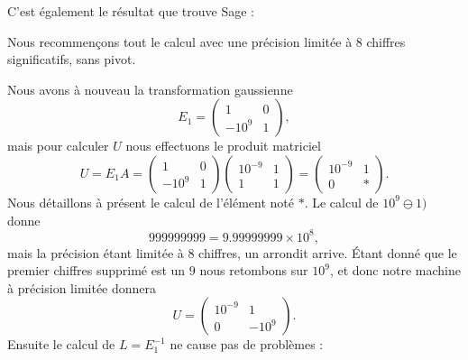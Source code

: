 \begin{example}
    C'est également le résultat que trouve Sage :
    
\end{example}

\begin{example}     \label{EXooNVRNooJgQmQc}
    Nous recommençons tout le calcul avec une précision limitée à \( 8\) chiffres significatifs, sans pivot.

    Nous avons à nouveau la transformation gaussienne
    \begin{equation}
        E_1=\begin{pmatrix}
            1    &   0    \\
            -10^9    &   1
        \end{pmatrix},
    \end{equation}
    mais pour calculer \( U\) nous effectuons le produit matriciel
    \begin{equation}
        U=E_1A=\begin{pmatrix}
            1    &   0    \\
            -10^9    &   1
        \end{pmatrix}\begin{pmatrix}
            10^{-9}   &   1    \\
            1    &   1
        \end{pmatrix}=\begin{pmatrix}
            10^{-9}    &   1    \\
            0    &   *
        \end{pmatrix}.
    \end{equation}
    Nous détaillons à présent le calcul de l'élément noté \( *\). Le calcul de \( 10^9\ominus 1)\) donne
    \begin{equation}
        999999999=9.99999999\times 10^{8},
    \end{equation}
    mais la précision étant limitée à \( 8\) chiffres, un arrondit arrive. Étant donné que le premier chiffres supprimé est un \( 9\) nous retombons sur \( 10^9\), et donc notre machine à précision limitée donnera
    \begin{equation}
        U=\begin{pmatrix}
            10^{-9}    &   1    \\
            0    &   -10^{9}
        \end{pmatrix}.
    \end{equation}
    Ensuite le calcul de \( L=E_1^{-1}\) ne cause pas de problèmes :

\end{example}
